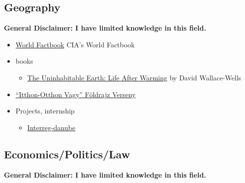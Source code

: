 \documentclass{article}
\begin{document}
\subsection{Geography}
\textbf{General Disclaimer: I have limited knowledge in this field.}


\begin{itemize}
    \item \href{https://www.cia.gov/the-world-factbook/}{World Factbook} CIA’s World Factbook
    \item books
    \begin{itemize}
        \item \href{https://www.goodreads.com/tr/book/show/41552709-the-uninhabitable-earth}{The Uninhabitable Earth: Life After Warming} by David Wallace-Wells
    \end{itemize}
    \item \href{http://eotvos-tata.edu.hu/versenyek/foldrajz/itthonotthon_index.htm}{``Itthon-Otthon Vagy'' Földrajz Verseny}
    \item Projects, internship
    \begin{itemize}
        \item \href{http://www.interreg-danube.eu/approved-projects/tid-y-up/partners}{Interreg-danube}
    \end{itemize}
\end{itemize}

\subsection{Economics/Politics/Law}
\textbf{General Disclaimer: I have limited knowledge in this field.}
\end{document}
